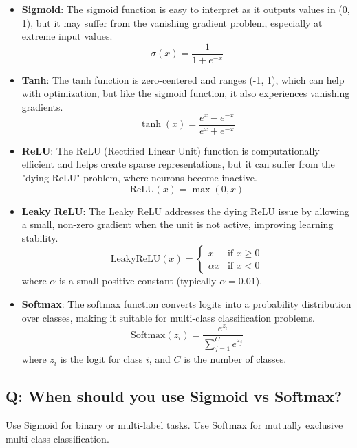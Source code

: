 \begin{itemize}
	\item \textbf{Sigmoid}: The sigmoid function is easy to interpret as it outputs values in (0, 1), but it may suffer from the vanishing gradient problem, especially at extreme input values.
	      \[
		      \sigma(x) = \frac{1}{1 + e^{-x}}
	      \]

	\item \textbf{Tanh}: The tanh function is zero-centered and ranges (-1, 1), which can help with optimization, but like the sigmoid function, it also experiences vanishing gradients.
	      \[
		      \tanh(x) = \frac{e^x - e^{-x}}{e^x + e^{-x}}
	      \]

	\item \textbf{ReLU}: The ReLU (Rectified Linear Unit) function is computationally efficient and helps create sparse representations, but it can suffer from the "dying ReLU" problem, where neurons become inactive.
	      \[
		      \text{ReLU}(x) = \max(0, x)
	      \]

	\item \textbf{Leaky ReLU}: The Leaky ReLU addresses the dying ReLU issue by allowing a small, non-zero gradient when the unit is not active, improving learning stability.
	      \[
		      \text{LeakyReLU}(x) =
		      \begin{cases}
			      x        & \text{if } x \geq 0 \\
			      \alpha x & \text{if } x < 0
		      \end{cases}
	      \]
	      where \( \alpha \) is a small positive constant (typically \( \alpha = 0.01 \)).

	\item \textbf{Softmax}: The softmax function converts logits into a probability distribution over classes, making it suitable for multi-class classification problems.
	      \[
		      \text{Softmax}(z_i) = \frac{e^{z_i}}{\sum_{j=1}^{C} e^{z_j}}
	      \]
	      where \( z_i \) is the logit for class \( i \), and \( C \) is the number of classes.
\end{itemize}

\subsection*{Q: When should you use Sigmoid vs Softmax?}
Use Sigmoid for binary or multi-label tasks. Use Softmax for mutually exclusive multi-class classification.
